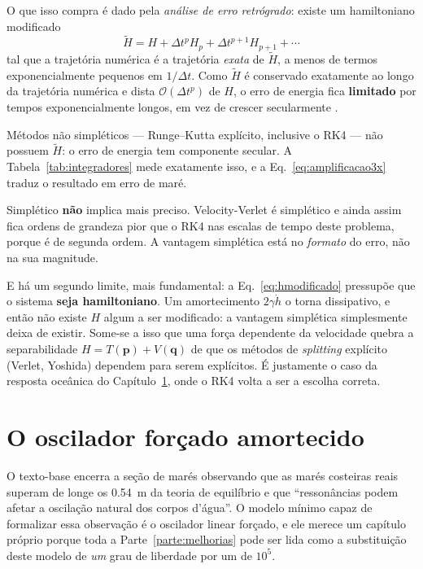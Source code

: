 \documentclass[11pt,a4paper,oneside]{report}
\theoremstyle{definition}
\theoremstyle{plain}
\theoremstyle{remark}
\newcommand{\vect}[1]{\bm{#1}}
\newcommand{\ordem}[1]{\mathcal{O}\!\left(#1\right)}
\begin{document}
O que isso compra é dado pela \emph{análise de erro retrógrado}: existe um
hamiltoniano modificado
\begin{equation}
\widetilde{H}=H+\Delta t^{p}H_{p}+\Delta t^{p+1}H_{p+1}+\cdots
\label{eq:hmodificado}
\end{equation}
tal que a trajetória numérica é a trajetória \emph{exata} de $\widetilde{H}$,
a menos de termos exponencialmente pequenos em $1/\Delta t$. Como
$\widetilde{H}$ é conservado exatamente ao longo da trajetória numérica e dista
$\ordem{\Delta t^{p}}$ de $H$, o erro de energia fica \textbf{limitado} por
tempos exponencialmente longos, em vez de crescer secularmente
\cite{hairer2006}.

Métodos não simpléticos — Runge--Kutta explícito, inclusive o RK4 — não
possuem $\widetilde{H}$: o erro de energia tem componente secular. A
Tabela~\ref{tab:integradores} mede exatamente isso, e a
Eq.~\eqref{eq:amplificacao3x} traduz o resultado em erro de maré.

\begin{alerta}
Simplético \textbf{não} implica mais preciso. Velocity-Verlet é simplético e
ainda assim fica ordens de grandeza pior que o RK4 nas escalas de tempo deste
problema, porque é de segunda ordem. A vantagem simplética está no
\emph{formato} do erro, não na sua magnitude.

E há um segundo limite, mais fundamental: a Eq.~\eqref{eq:hmodificado} pressupõe
que o sistema \textbf{seja hamiltoniano}. Um amortecimento $2\gamma\dot h$ o
torna dissipativo, e então não existe $H$ algum a ser modificado: a vantagem
simplética simplesmente deixa de existir. Some-se a isso que uma força
dependente da velocidade quebra a separabilidade $H=T(\vect{p})+V(\vect{q})$ de
que os métodos de \emph{splitting} explícito (Verlet, Yoshida) dependem para
serem explícitos. É justamente o caso da resposta oceânica do
Capítulo~\ref{cap:oscilador}, onde o RK4 volta a ser a escolha correta.
\end{alerta}

\chapter{O oscilador forçado amortecido}
\label{cap:oscilador}

O texto-base encerra a seção de marés observando que as marés costeiras reais
superam de longe os \SI{0.54}{\meter} da teoria de equilíbrio e que
``ressonâncias podem afetar a oscilação natural dos corpos d'água''. O modelo
mínimo capaz de formalizar essa observação é o oscilador linear forçado, e ele
merece um capítulo próprio porque toda a Parte~\ref{parte:melhorias} pode ser
lida como a substituição deste modelo de \emph{um} grau de liberdade por um de
$10^{5}$.
\end{document}
